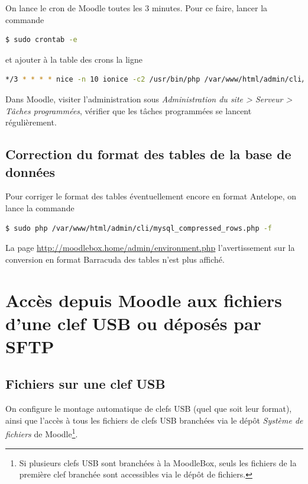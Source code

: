 \documentclass[11pt]{article}
\begin{document}
On lance le cron de Moodle toutes les 3 minutes. Pour ce faire, lancer la commande

\begin{lstlisting}[language=bash]
$ sudo crontab -e
\end{lstlisting}

et ajouter à la table des crons la ligne
\begin{lstlisting}[language=bash]
*/3 * * * * nice -n 10 ionice -c2 /usr/bin/php /var/www/html/admin/cli/cron.php
\end{lstlisting}

\begin{verification}
Dans Moodle, visiter l'administration sous \emph{Administration du site > Serveur > Tâches programmées}, vérifier que les tâches programmées se lancent régulièrement.
\end{verification}

\subsection{Correction du format des tables de la base de données}

Pour corriger le format des tables éventuellement encore en format Antelope, on lance la commande

\begin{lstlisting}[language=bash]
$ sudo php /var/www/html/admin/cli/mysql_compressed_rows.php -f
\end{lstlisting}

\begin{verification}
La page \url{http://moodlebox.home/admin/environment.php} l'avertissement sur la conversion en format Barracuda des tables n'est plus affiché.
\end{verification}

\section{Accès depuis Moodle aux fichiers d'une clef USB ou déposés par SFTP}

\subsection{Fichiers sur une clef USB}

On configure le montage automatique de clefs USB (quel que soit leur format), ainsi que l'accès à tous les fichiers de clefs USB branchées via le dépôt \emph{Système de fichiers} de Moodle\footnote{Si plusieurs clefs USB sont branchées à la MoodleBox, seuls les fichiers de la première clef branchée sont accessibles via le dépôt de fichiers.}.
\end{document}
